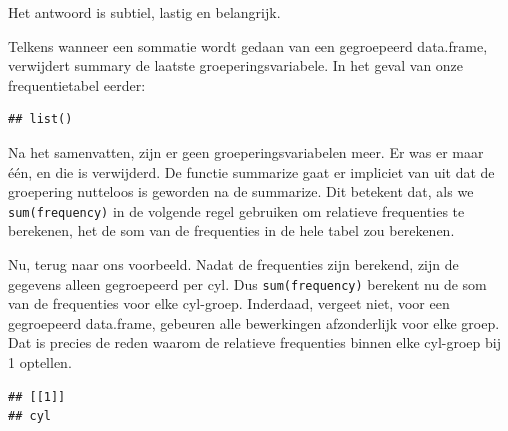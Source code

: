 \documentclass[]{tufte-book}
\newenvironment{Shaded}{}{}
\newcommand{\DataTypeTok}[1]{\textcolor[rgb]{0.56,0.13,0.00}{#1}}
\newcommand{\KeywordTok}[1]{\textcolor[rgb]{0.00,0.44,0.13}{\textbf{#1}}}
\newcommand{\NormalTok}[1]{#1}
\newcommand{\OperatorTok}[1]{\textcolor[rgb]{0.40,0.40,0.40}{#1}}
\newcommand{\StringTok}[1]{\textcolor[rgb]{0.25,0.44,0.63}{#1}}
\begin{document}
Het antwoord is subtiel, lastig en belangrijk.

Telkens wanneer een sommatie wordt gedaan van een gegroepeerd data.frame, verwijdert summary de laatste groeperingsvariabele. In het geval van onze frequentietabel eerder:

\begin{Shaded}
\end{Shaded}

\begin{verbatim}
## list()
\end{verbatim}

Na het samenvatten, zijn er geen groeperingsvariabelen meer. Er was er maar één, en die is verwijderd. De functie summarize gaat er impliciet van uit dat de groepering nutteloos is geworden na de summarize. Dit betekent dat, als we \texttt{sum(frequency)} in de volgende regel gebruiken om relatieve frequenties te berekenen, het de som van de frequenties in de hele tabel zou berekenen.

Nu, terug naar ons voorbeeld. Nadat de frequenties zijn berekend, zijn de gegevens alleen gegroepeerd per cyl. Dus \texttt{sum(frequency)} berekent nu de som van de frequenties voor elke cyl-groep. Inderdaad, vergeet niet, voor een gegroepeerd data.frame, gebeuren alle bewerkingen afzonderlijk voor elke groep. Dat is precies de reden waarom de relatieve frequenties binnen elke cyl-groep bij 1 optellen.

\begin{Shaded}
\end{Shaded}

\begin{verbatim}
## [[1]]
## cyl
\end{verbatim}
\end{document}
